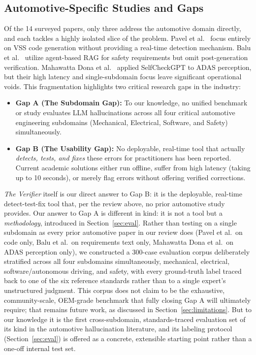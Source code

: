 \documentclass[conference,a4paper]{IEEEtran}
\begin{document}
\subsection{Automotive-Specific Studies and Gaps}
Of the 14 surveyed papers, only three address the automotive domain directly, and each tackles a highly isolated slice of the problem. Pavel et al.~\cite{ref4} focus entirely on VSS code generation without providing a real-time detection mechanism. Balu et al.~\cite{ref5} utilize agent-based RAG for safety requirements but omit post-generation verification. Mahawatta Dona et al.~\cite{ref8} applied SelfCheckGPT to ADAS perception, but their high latency and single-subdomain focus leave significant operational voids.
This fragmentation highlights two critical research gaps in the industry:
\begin{itemize}
    \item \textbf{Gap A (The Subdomain Gap):} To our knowledge, no unified benchmark or study evaluates LLM hallucinations across all four critical automotive engineering subdomains (Mechanical, Electrical, Software, and Safety) simultaneously.
    \item \textbf{Gap B (The Usability Gap):} No deployable, real-time tool that actually \textit{detects, tests, and fixes} these errors for practitioners has been reported. Current academic solutions either run offline, suffer from high latency (taking up to 10 seconds), or merely flag errors without offering verified corrections.
\end{itemize}
\textit{The Verifier} itself is our direct answer to Gap B: it is the deployable, real-time detect-test-fix tool that, per the review above, no prior automotive study provides. Our answer to Gap A is different in kind: it is not a tool but a \emph{methodology}, introduced in Section~\ref{sec:eval}. Rather than testing on a single subdomain as every prior automotive paper in our review does (Pavel et al.\ on code only, Balu et al.\ on requirements text only, Mahawatta Dona et al.\ on ADAS perception only), we constructed a 300-case evaluation corpus deliberately stratified across all four subdomains simultaneously, mechanical, electrical, software/autonomous driving, and safety, with every ground-truth label traced back to one of the six reference standards rather than to a single expert's unstructured judgment. This corpus does not claim to be the exhaustive, community-scale, OEM-grade benchmark that fully closing Gap A will ultimately require; that remains future work, as discussed in Section~\ref{sec:limitations}. But to our knowledge it is the first cross-subdomain, standards-traced evaluation set of its kind in the automotive hallucination literature, and its labeling protocol (Section~\ref{sec:eval}) is offered as a concrete, extensible starting point rather than a one-off internal test set.
\end{document}
